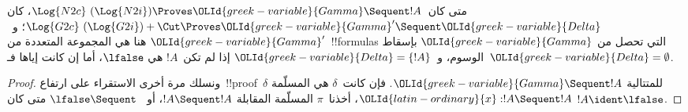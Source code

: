 \documentclass[../../../include/open-logic-section]{subfiles}
\begin{document}


\begin{prop}
متى كان~$\Log{N2c}\ (\Log{N2i}) \Proves \OLId{greek-variable}{Gamma} \Sequent !A$، كان
$\Log{G2c}\ (\Log{G2i}) + \Cut \Proves \OLId{greek-variable}{Gamma}' \Sequent \OLId{greek-variable}{Delta}$؛
و~$\OLId{greek-variable}{Gamma}'$ هنا هي المجموعة المتعددة من~!!{formula}s التي تحصل من
$\OLId{greek-variable}{Gamma}$ بإسقاط الوسوم، و~$\OLId{greek-variable}{Delta} = \{!A\}$ إذا لم تكن~$!A$ هي
$\lfalse$، أما إن كانت إياها فـ~$\OLId{greek-variable}{Delta} = \emptyset$.
\end{prop}

\begin{proof}
ونسلك مرة أخرى الاستقراء على ارتفاع~!!{proof}~$\delta$ للمتتالية
$\OLId{greek-variable}{Gamma} \Sequent !A$. فإن كانت~$\delta$ هي المسلّمة
$\OLId{latin-ordinary}{x}:!A \Sequent !A$، أخذنا~$\pi$ المسلّمة المقابلة
$!A \Sequent !A$، أو~$\lfalse \Sequent \ $ متى كان
$!A \ident \lfalse$.


\end{proof}
\end{document}
